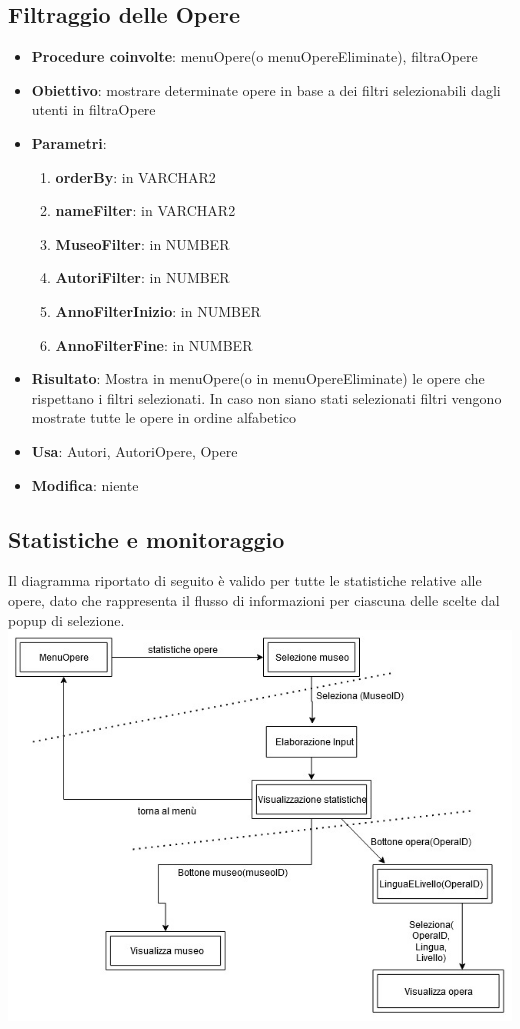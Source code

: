 \label{Filtraggio delle opere}
\subsection{Filtraggio delle Opere}
\begin{itemize}
	\item \textbf{Procedure coinvolte}: menuOpere(o menuOpereEliminate), filtraOpere
	\item \textbf{Obiettivo}: mostrare determinate opere in base a dei filtri selezionabili dagli utenti in filtraOpere
	\item \textbf{Parametri}:
	\begin{enumerate}
		\item \textbf{orderBy}: in VARCHAR2
		\item \textbf{nameFilter}: in VARCHAR2
		\item \textbf{MuseoFilter}: in NUMBER
		\item \textbf{AutoriFilter}: in NUMBER 
		\item \textbf{AnnoFilterInizio}: in NUMBER 
		\item \textbf{AnnoFilterFine}: in NUMBER
	\end{enumerate}
	\item \textbf{Risultato}: Mostra in menuOpere(o in menuOpereEliminate) le opere che rispettano i filtri selezionati. In caso non siano stati selezionati filtri vengono mostrate tutte le opere in ordine alfabetico
	\item \textbf{Usa}: Autori, AutoriOpere, Opere
	\item \textbf{Modifica}: niente
\end{itemize}

\subsection{Statistiche e monitoraggio}
Il diagramma riportato di seguito è valido per tutte le statistiche relative alle opere, dato che rappresenta il flusso di informazioni per ciascuna delle scelte dal popup di selezione.\\[1cm]
\includegraphics[width=\textwidth]{img/VisualizzazioneStatistiche.jpg}\\[1cm]

